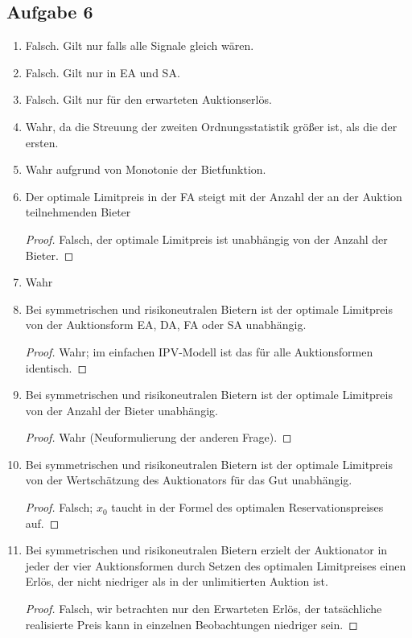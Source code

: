 \documentclass[12pt]{extreport} %
\theoremstyle{named}
\theoremstyle{itshape}
\theoremstyle{normal}
\begin{document}
\subsection*{Aufgabe 6}

\begin{enumerate} 
	\item Falsch. Gilt nur falls alle Signale gleich wären.
	\item Falsch. Gilt nur in EA und SA.
	\item Falsch. Gilt nur für den erwarteten Auktionserlös.
	\item Wahr, da die Streuung der zweiten Ordnungsstatistik größer ist, als die der ersten.
	\item Wahr aufgrund von Monotonie der Bietfunktion.
	\item Der optimale Limitpreis in der FA steigt mit der Anzahl der an der Auktion teilnehmenden Bieter 
		\begin{proof}
			Falsch, der optimale Limitpreis ist unabhängig von der Anzahl der Bieter.	
		\end{proof} 
	\item Wahr
	\item Bei symmetrischen und risikoneutralen Bietern ist der optimale Limitpreis von der Auktionsform EA, DA, FA oder SA unabhängig.
		\begin{proof}
			Wahr; im einfachen IPV-Modell ist das für alle Auktionsformen identisch.
		\end{proof}
	\item Bei symmetrischen und risikoneutralen Bietern ist der optimale Limitpreis von der Anzahl der Bieter unabhängig.
		\begin{proof}
			Wahr (Neuformulierung der anderen Frage).
		\end{proof}
	\item Bei symmetrischen und risikoneutralen Bietern ist der optimale Limitpreis von der Wertschätzung des Auktionators für das Gut unabhängig.
		\begin{proof}
			Falsch; $x_{0}$ taucht in der Formel des optimalen Reservationspreises auf.
		\end{proof}
	\item Bei symmetrischen und risikoneutralen Bietern erzielt der Auktionator in jeder der vier Auktionsformen durch Setzen des optimalen Limitpreises einen Erlös, der nicht niedriger als in der unlimitierten Auktion ist.
		\begin{proof}
			Falsch, wir betrachten nur den Erwarteten Erlös, der tatsächliche realisierte Preis kann in einzelnen Beobachtungen niedriger sein.

\end{proof}
\end{enumerate}
\end{document}
